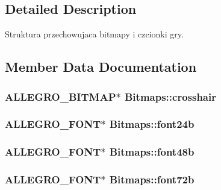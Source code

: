 \subsection{Detailed Description}
Struktura przechowujaca bitmapy i czcionki gry. 

\subsection{Member Data Documentation}
\subsubsection[{\texorpdfstring{crosshair}{crosshair}}]{\setlength{\rightskip}{0pt plus 5cm}A\+L\+L\+E\+G\+R\+O\+\_\+\+B\+I\+T\+M\+AP$\ast$ Bitmaps\+::crosshair}\hypertarget{struct_bitmaps_afe9dc39c95d496b9b0fc49eee3463ac5}{}\label{struct_bitmaps_afe9dc39c95d496b9b0fc49eee3463ac5}
\subsubsection[{\texorpdfstring{font24b}{font24b}}]{\setlength{\rightskip}{0pt plus 5cm}A\+L\+L\+E\+G\+R\+O\+\_\+\+F\+O\+NT$\ast$ Bitmaps\+::font24b}\hypertarget{struct_bitmaps_a864ceb68e32314229fdb76145a065f1d}{}\label{struct_bitmaps_a864ceb68e32314229fdb76145a065f1d}
\subsubsection[{\texorpdfstring{font48b}{font48b}}]{\setlength{\rightskip}{0pt plus 5cm}A\+L\+L\+E\+G\+R\+O\+\_\+\+F\+O\+NT$\ast$ Bitmaps\+::font48b}\hypertarget{struct_bitmaps_a3ec81a0bd11178b615f8aae0c0df9be6}{}\label{struct_bitmaps_a3ec81a0bd11178b615f8aae0c0df9be6}
\subsubsection[{\texorpdfstring{font72b}{font72b}}]{\setlength{\rightskip}{0pt plus 5cm}A\+L\+L\+E\+G\+R\+O\+\_\+\+F\+O\+NT$\ast$ Bitmaps\+::font72b}\hypertarget{struct_bitmaps_a506477a9cf5c68f1b470de7102396794}{}\label{struct_bitmaps_a506477a9cf5c68f1b470de7102396794}
